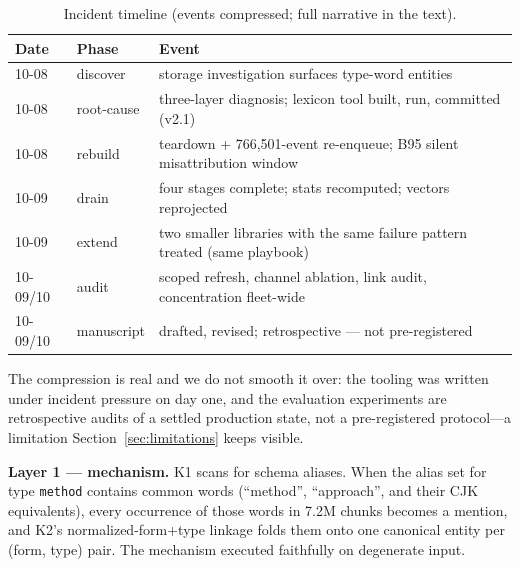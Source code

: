 \documentclass[preprint,12pt]{elsarticle}
\begin{document}
\begin{table}[t]
\centering
\caption{Incident timeline (events compressed; full narrative in the text).}
\label{tab:timeline}
\small
\begin{tabularx}{\textwidth}{@{}llX@{}}
\toprule
Date & Phase & Event \\
\midrule
10-08 & discover & storage investigation surfaces type-word entities \\
10-08 & root-cause & three-layer diagnosis; lexicon tool built, run, committed (v2.1) \\
10-08 & rebuild & teardown + 766{,}501-event re-enqueue; B95 silent misattribution window \\
10-09 & drain & four stages complete; stats recomputed; vectors reprojected \\
10-09 & extend & two smaller libraries with the same failure pattern treated (same playbook) \\
10-09/10 & audit & scoped refresh, channel ablation, link audit, concentration fleet-wide \\
10-09/10 & manuscript & drafted, revised; retrospective --- not pre-registered \\
\bottomrule
\end{tabularx}
\end{table}

The compression is real and we do not smooth it over: the tooling was
written under incident pressure on day one, and the evaluation
experiments are retrospective audits of a settled production state, not
a pre-registered protocol---a limitation Section~\ref{sec:limitations}
keeps visible.

\textbf{Layer 1 --- mechanism.} K1 scans for schema aliases. When the alias
set for type \texttt{method} contains common words (``method'',
``approach'', and their CJK equivalents), every occurrence of those words in
7.2M chunks becomes a mention, and K2's normalized-form+type linkage folds
them onto one canonical entity per (form, type) pair. The mechanism executed
faithfully on degenerate input.
\end{document}
